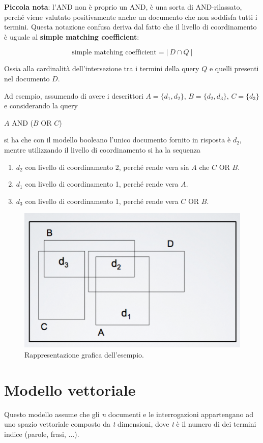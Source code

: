 \textbf{Piccola nota}: l'AND non è proprio un AND, è una sorta di AND-rilassato, perché viene valutato positivamente anche un documento che non soddisfa tutti i termini. Questa notazione confusa deriva dal fatto che il livello di coordinamento è uguale al \textbf{simple matching coefficient}:

$$
\text{simple matching coefficient} = |\ D \cap Q \ |
$$

\noindent Ossia alla cardinalità dell'intersezione tra i termini della query $Q$ e quelli presenti nel documento $D$.

Ad esempio, assumendo di avere i descrittori $A = \{d_1, d_2\}$, $B = \{d_2, d_3\}$, $C =\{d_3\}$ e considerando la query

\begin{center}
	$A$ AND ($B$ OR $C$)
\end{center}

\noindent si ha che con il modello booleano l'unico documento fornito in risposta è $d_2$, mentre utilizzando il livello di coordinamento si ha la sequenza
\begin{enumerate}
	\item $d_2$ con livello di coordinamento 2, perché rende vera sia $A$ che $C$ OR $B$.
	\item $d_1$ con livello di coordinamento 1, perché rende vera $A$.
	\item $d_3$ con livello di coordinamento 1, perché rende vera $C$ OR $B$.
\end{enumerate}

\begin{figure}[htbp]
	\centering
	\includegraphics[width=0.4\linewidth]{images/l8-cord-gen}
	\caption{Rappresentazione grafica dell'esempio.}
\end{figure}

\section{Modello vettoriale}

Questo modello assume che gli \textit{n} documenti e le interrogazioni appartengano ad uno spazio vettoriale composto da \textit{t} dimensioni, dove \textit{t} è il numero di dei termini indice (parole, frasi, $\ldots$).

